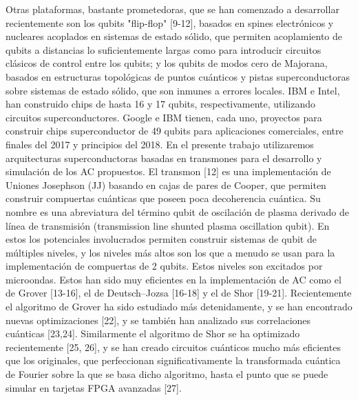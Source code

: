 Otras plataformas, bastante prometedoras, que se han comenzado a desarrollar recientemente son los qubits "flip-flop" [9-12], basados en spines electrónicos y nucleares acoplados en sistemas de estado sólido, que permiten acoplamiento de qubits a distancias lo suficientemente largas como para introducir circuitos clásicos de control entre los qubits; y los qubits de modos cero de Majorana, basados en estructuras topológicas de puntos cuánticos y pistas superconductoras sobre sistemas de estado sólido, que son inmunes a errores locales. IBM e Intel, han construido chips de hasta 16 y 17 qubits, respectivamente, utilizando circuitos superconductores. Google e IBM tienen, cada uno, proyectos para construir chips superconductor de 49 qubits para aplicaciones comerciales, entre finales del 2017 y principios del 2018.  En el presente trabajo utilizaremos arquitecturas superconductoras basadas en transmones para el desarrollo y simulación de los AC propuestos. El transmon [12] es una implementación de Uniones Josephson (JJ) basando en cajas de pares de Cooper, que permiten construir compuertas cuánticas que poseen poca decoherencia cuántica. Su nombre es una abreviatura del término qubit de oscilación de plasma derivado de línea de transmisión (transmission line shunted plasma oscillation qubit). En estos los potenciales involucrados permiten construir sistemas de qubit de múltiples niveles, y los niveles más altos son los que a menudo se usan para la implementación de compuertas de 2 qubits. Estos niveles son excitados por microondas. Estos han sido muy eficientes en la implementación de AC como el de Grover [13-16], el de Deutsch–Jozsa [16-18] y el de Shor [19-21].  Recientemente el algoritmo de Grover ha sido estudiado más detenidamente, y se han encontrado nuevas optimizaciones [22], y se también han analizado sus correlaciones cuánticas [23,24]. Similarmente el algoritmo de Shor se ha optimizado recientemente [25, 26], y se han creado circuitos cuánticos mucho más eficientes que los originales, que perfeccionan significativamente la transformada cuántica de Fourier sobre la que se basa dicho algoritmo, hasta el punto que se puede simular en tarjetas FPGA avanzadas [27].


